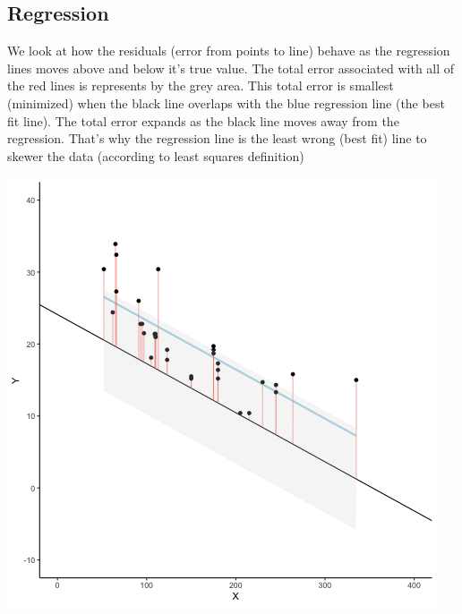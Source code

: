 \documentclass[]{book}
\begin{document}
\hypertarget{regression}{%
\subsection{Regression}\label{regression}}

We look at how the residuals (error from points to line) behave as the regression lines moves above and below it's true value. The total error associated with all of the red lines is represents by the grey area. This total error is smallest (minimized) when the black line overlaps with the blue regression line (the best fit line). The total error expands as the black line moves away from the regression. That's why the regression line is the least wrong (best fit) line to skewer the data (according to least squares definition)

\includegraphics{gifs/regression-1.gif}
\end{document}
